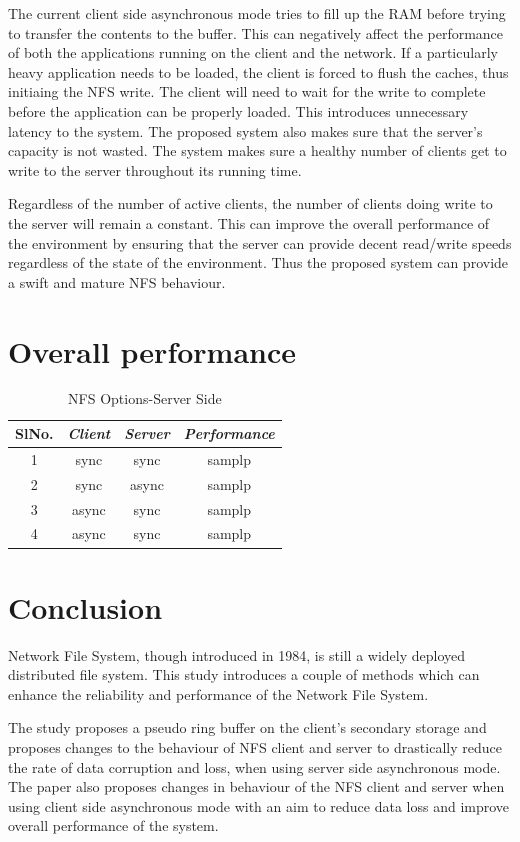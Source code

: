 \documentclass[conference]{IEEEtran}
\begin{document}
The current client side asynchronous mode tries to fill up the RAM before
trying to transfer the contents to the buffer. This can negatively affect
the performance of both the applications running on the client and the
network. If a particularly heavy application needs to be loaded, the client 
is forced to flush the caches, thus initiaing the NFS write. The client
will need to wait for the write to complete before the application can be
properly loaded. This introduces unnecessary latency to the system. The 
proposed system also makes sure that the server's capacity is not wasted. The 
system makes sure a healthy number of clients get to write to the server
throughout its running time.

Regardless of the number of active clients, the number of clients doing
write to the server will remain a constant. This can improve the overall 
performance of the environment by ensuring that the server can provide 
decent read/write speeds regardless of the state of the environment. Thus
the proposed system can provide a swift and mature NFS behaviour.
\section{Overall performance}
\begin{table}[htbp]
\caption{NFS Options-Server Side}
\begin{center}
\begin{tabular}{|c|c|c|c|}
\hline
\cline{2-3} 
\textbf{SlNo.} & \textbf{\textit{Client}}& \textbf{\textit{Server}}&\textbf{\textit{Performance}} \\
\hline
1& sync & sync & samplp  \\
2& sync & async & samplp  \\
3& async & sync & samplp  \\
4& async & sync & samplp  \\
\hline
\end{tabular}
\label{tab1}
\end{center}
\end{table}
\section{Conclusion}
Network File System, though introduced in 1984, is still a widely deployed
distributed file system. This study introduces a couple of methods which can
enhance the reliability and performance of the Network File System.

The study proposes a pseudo ring buffer on the client's secondary storage
and proposes changes to the behaviour of NFS client and server to 
drastically reduce the rate of data corruption and loss, when using server
side asynchronous mode. The paper also proposes changes in behaviour of the
NFS client and server when using client side asynchronous mode with an aim 
to reduce data loss and improve overall performance of the system.
\end{document}
